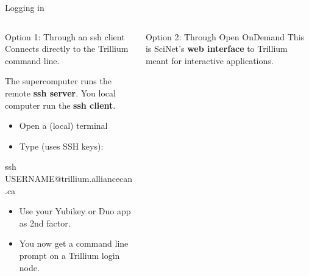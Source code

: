 \documentclass[
  10pt,
  ignorenonframetext,
  aspectratio=169,handout]{beamer}
\newenvironment{Shaded}{\begin{snugshade}}{\end{snugshade}}
\newcommand{\FunctionTok}[1]{\textcolor[rgb]{0.94,0.94,0.56}{#1}}
\newcommand{\NormalTok}[1]{\textcolor[rgb]{0.80,0.80,0.80}{#1}}
\begin{document}
\begin{frame}[fragile]{Logging in}
\label{logging-in}
\begin{columns}[T]
\begin{column}{0.47\linewidth}\setlength{\parskip}{0.5\baselineskip}
\begin{block}{Option 1: Through an ssh client}\setlength{\parskip}{0.5\baselineskip}
\label{option-1-through-an-ssh-client}
Connects directly to the Trillium command line.

\pause

The supercomputer runs the remote \textbf{ssh server}. You local computer run the \textbf{ssh client}.

\pause

\begin{itemize}
\item
  Open a (local) terminal

  \pause
\item
  Type (uses SSH keys):\\
  \small
\end{itemize}

\begin{Shaded}
\begin{Highlighting}[]
   \FunctionTok{ssh}\NormalTok{ USERNAME@trillium.alliancecan.ca}
\end{Highlighting}
\end{Shaded}

\pause

\begin{itemize}
\item
  Use your Yubikey or Duo app as 2nd factor.

  \pause
\item
  You now get a command line prompt on a Trillium login node.
\end{itemize}

\vspace{\baselineskip}
\end{block}
\end{column}

\begin{column}{0.47\linewidth}\setlength{\parskip}{0.5\baselineskip}
\pause

\begin{block}{Option 2: Through Open OnDemand}\setlength{\parskip}{0.5\baselineskip}
\label{option-2-through-open-ondemand}
This is SciNet's \textbf{web interface} to Trillium meant for interactive applications.


\end{block}
\end{column}
\end{columns}
\end{frame}
\end{document}
